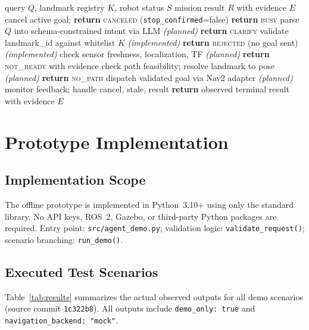 \documentclass[conference]{IEEEtran}
\begin{document}
\begin{algorithmic}[1]
\REQUIRE query $Q$, landmark registry $K$, robot status $S$
\ENSURE mission result $R$ with evidence $E$
  \STATE cancel active goal; \textbf{return} \textsc{canceled} (\texttt{stop\_confirmed}=false)
\ENDIF
{}
  \STATE \textbf{return} \textsc{busy}
\ENDIF
\STATE parse $Q$ into schema-constrained intent via LLM \hfill\textit{(planned)}
  \STATE \textbf{return} \textsc{clarify}
\ENDIF
\STATE validate landmark\_id against whitelist $K$ \hfill\textit{(implemented)}
  \STATE \textbf{return} \textsc{rejected} (no goal sent) \hfill\textit{(implemented)}
\ENDIF
\STATE check sensor freshness, localization, TF \hfill\textit{(planned)}
  \STATE \textbf{return} \textsc{not\_ready} with evidence
\ENDIF
\STATE check path feasibility; resolve landmark to pose \hfill\textit{(planned)}
  \STATE \textbf{return} \textsc{no\_path}
\ENDIF
\STATE dispatch validated goal via Nav2 adapter \hfill\textit{(planned)}
  \STATE monitor feedback; handle cancel, stale, result
\ENDWHILE
\STATE \textbf{return} observed terminal result with evidence $E$
\end{algorithmic}

\section{Prototype Implementation}

\subsection{Implementation Scope}

The offline prototype is implemented in Python~3.10+ using only the standard library.
No API keys, ROS~2, Gazebo, or third-party Python packages are required. Entry point:
\texttt{src/agent\_demo.py}; validation logic: \texttt{validate\_request()};
scenario branching: \texttt{run\_demo()}.

\subsection{Executed Test Scenarios}

Table~\ref{tab:results} summarizes the actual observed outputs for all demo scenarios
(source commit \texttt{1c322b8}). All outputs include \texttt{demo\_only: true} and
\texttt{navigation\_backend: "mock"}.
\end{document}

